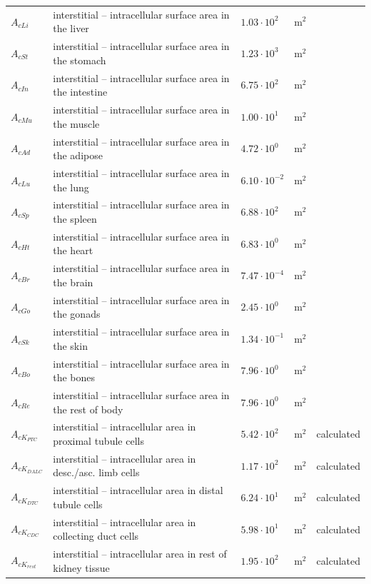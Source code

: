 \documentclass[preprint,12pt,authoryear]{elsarticle}
\begin{document}
\begin{longtable}{P{2cm}P{3.5cm}P{2cm}P{1cm}P{2.5cm}}
$A_{cLi}$   & interstitial – intracellular surface area in the liver         & $1.03 \cdot 10^{2}$ & $\text{m}^2$ & \citep{willmann_2003}\\
$A_{cSt}$   & interstitial – intracellular surface area in the stomach       & $1.23 \cdot 10^{3}$ & $\text{m}^2$ & \citep{willmann_2003}\\
$A_{cIn}$   & interstitial – intracellular surface area in the intestine     & $6.75 \cdot 10^{2}$ & $\text{m}^2$ & \citep{willmann_2003} \\
$A_{cMu}$   & interstitial – intracellular surface area in the muscle        & $1.00 \cdot 10^{1}$ & $\text{m}^2$ & \citep{willmann_2003} \\
$A_{cAd}$   & interstitial – intracellular surface area in the adipose       & $4.72 \cdot 10^{0}$ & $\text{m}^2$ & \citep{willmann_2003} \\
$A_{cLu}$   & interstitial – intracellular surface area in the lung          & $6.10 \cdot 10^{-2}$ & $\text{m}^2$ & \citep{willmann_2003}\\
$A_{cSp}$   & interstitial – intracellular surface area in the spleen        & $6.88 \cdot 10^{2}$ & $\text{m}^2$ & \citep{willmann_2003} \\
$A_{cHt}$   & interstitial – intracellular surface area in the heart         & $6.83 \cdot 10^{0}$ & $\text{m}^2$ & \citep{willmann_2003} \\
$A_{cBr}$   & interstitial – intracellular surface area in the brain         & $7.47 \cdot 10^{-4}$ & $\text{m}^2$ & \citep{willmann_2003} \\
$A_{cGo}$   & interstitial – intracellular surface area in the gonads        & $2.45 \cdot 10^{0}$ & $\text{m}^2$ & \citep{willmann_2003} \\
$A_{cSk}$   & interstitial – intracellular surface area in the skin          & $1.34 \cdot 10^{-1}$ & $\text{m}^2$ & \citep{willmann_2003} \\
$A_{cBo}$   & interstitial – intracellular surface area in the bones         & $7.96 \cdot 10^{0}$ & $\text{m}^2$ & \citep{willmann_2003} \\
$A_{cRe}$   & interstitial – intracellular surface area in the rest of body  & $7.96 \cdot 10^{0}$ & $\text{m}^2$ & \citep{willmann_2003} \\

$A_{cK_{\!PTC}}$  & interstitial – intracellular area in proximal tubule cells       & $5.42 \cdot 10^{2}$ & $\text{m}^2$ & calculated \\
$A_{cK_{\!DALC}}$ & interstitial – intracellular area in desc./asc. limb cells       & $1.17 \cdot 10^{2}$ & $\text{m}^2$ & calculated \\
$A_{cK_{\!DTC}}$  & interstitial – intracellular area in distal tubule cells         & $6.24 \cdot 10^{1}$ & $\text{m}^2$ & calculated \\
$A_{cK_{\!CDC}}$  & interstitial – intracellular area in collecting duct cells       & $5.98 \cdot 10^{1}$ & $\text{m}^2$ & calculated \\
$A_{cK_{\!rest}}$ & interstitial – intracellular area in rest of kidney tissue       & $1.95 \cdot 10^{2}$ & $\text{m}^2$ & calculated \\


\end{longtable}
\end{document}

